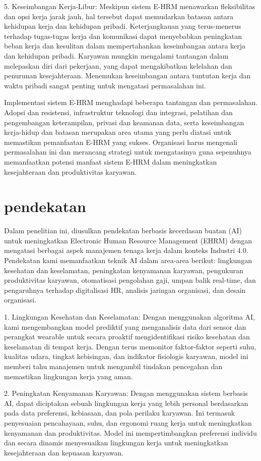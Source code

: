 \documentclass[12pt]{article}
\begin{document}
5. Keseimbangan Kerja-Libur:
Meskipun sistem E-HRM menawarkan fleksibilitas dan opsi kerja jarak jauh, hal tersebut dapat memudarkan batasan antara kehidupan kerja dan kehidupan pribadi. Keterjangkauan yang terus-menerus terhadap tugas-tugas kerja dan komunikasi dapat menyebabkan peningkatan beban kerja dan kesulitan dalam mempertahankan keseimbangan antara kerja dan kehidupan pribadi. Karyawan mungkin mengalami tantangan dalam melepaskan diri dari pekerjaan, yang dapat mengakibatkan kelelahan dan penurunan kesejahteraan. Menemukan keseimbangan antara tuntutan kerja dan waktu pribadi sangat penting untuk mengatasi permasalahan ini.

Implementasi sistem E-HRM menghadapi beberapa tantangan dan permasalahan. Adopsi dan resistensi, infrastruktur teknologi dan integrasi, pelatihan dan pengembangan keterampilan, privasi dan keamanan data, serta keseimbangan kerja-hidup dan batasan merupakan area utama yang perlu diatasi untuk memastikan pemanfaatan E-HRM yang sukses. Organisasi harus mengenali permasalahan ini dan merancang strategi untuk mengatasinya guna sepenuhnya memanfaatkan potensi manfaat sistem E-HRM dalam meningkatkan kesejahteraan dan produktivitas karyawan.
\section*{pendekatan}
% 


Dalam penelitian ini, diusulkan pendekatan berbasis kecerdasan buatan (AI) untuk meningkatkan Electronic Human Resource Management (EHRM) dengan mengatasi berbagai aspek manajemen tenaga kerja dalam konteks Industri 4.0. Pendekatan kami memanfaatkan teknik AI dalam area-area berikut: lingkungan kesehatan dan keselamatan, peningkatan kenyamanan karyawan, pengukuran produktivitas karyawan, otomatisasi pengolahan gaji, umpan balik real-time, dan pengaruhnya terhadap digitalisasi HR, analisis jaringan organisasi, dan desain organisasi.

1. Lingkungan Kesehatan dan Keselamatan:
Dengan menggunakan algoritma AI, kami mengembangkan model prediktif yang menganalisis data dari sensor dan perangkat wearable untuk secara proaktif mengidentifikasi risiko kesehatan dan keselamatan di tempat kerja. Dengan terus memonitor faktor-faktor seperti suhu, kualitas udara, tingkat kebisingan, dan indikator fisiologis karyawan, model ini memberi tahu manajemen untuk mengambil tindakan pencegahan dan memastikan lingkungan kerja yang aman.

2. Peningkatan Kenyamanan Karyawan:
Dengan menggunakan sistem berbasis AI, dapat diciptakan sebuah lingkungan kerja yang lebih personal berdasarkan pada data preferensi, kebiasaan, dan pola perilaku karyawan. Ini termasuk penyesuaian pencahayaan, suhu, dan ergonomi ruang kerja untuk meningkatkan kenyamanan dan produktivitas. Model ini mempertimbangkan preferensi individu dan secara dinamis menyesuaikan lingkungan kerja untuk meningkatkan kesejahteraan dan kepuasan karyawan.
\end{document}
